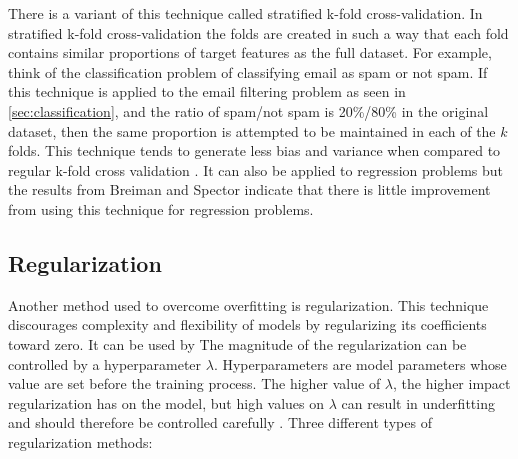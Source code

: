 

	There is a variant of this technique called stratified k-fold cross-validation. In stratified k-fold cross-validation the folds are created in such a way that each fold contains similar proportions of target features as the full dataset. For example, think of the classification problem of classifying email as spam or not spam. If this technique is applied to the email filtering problem as seen in \ref{sec:classification}, and the ratio of spam/not spam is 20\%/80\% in the original dataset, then the same proportion is attempted to be maintained in each of the $k$ folds. This technique tends to generate less bias and variance when compared to regular k-fold cross validation \cite{IP:2}. It can also be applied to regression problems but the results from Breiman and Spector \cite{ARTICLE:5} indicate that there is little improvement from using this technique for regression problems.

	\subsection{Regularization} \label{sec:regularization}
	Another method used to overcome overfitting is regularization. This technique discourages complexity and flexibility of models by regularizing its coefficients toward zero. It can be used by The magnitude of the regularization can be controlled by a hyperparameter $\lambda$. Hyperparameters are model parameters whose value are set before the training process. The higher value of $\lambda$, the higher impact regularization has on the model, but high values on $\lambda$ can result in underfitting and should therefore be controlled carefully \cite{WEBSITE:13}. Three different types of regularization methods:

